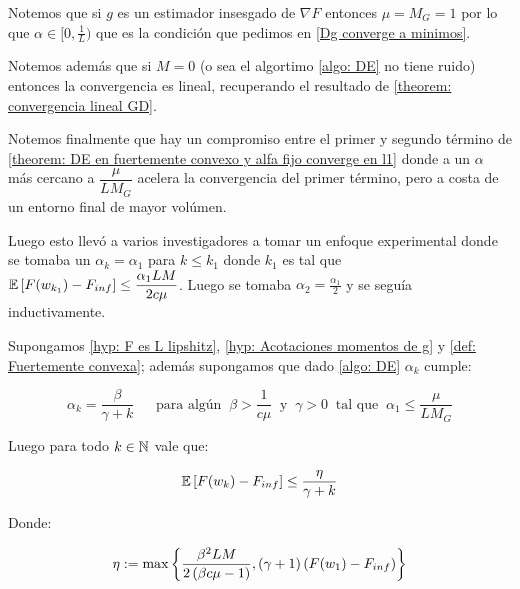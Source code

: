 \begin{remark}
	Notemos que si $g$ es un estimador insesgado de $\nabla F$ entonces $\mu = M_G = 1$ por lo que $\alpha \in [0, \frac{1}{L})$ que es la condici\'on que pedimos en \ref{Dg converge a minimos}.
\end{remark}

\begin{remark}
	Notemos adem\'as que si $M=0$ (o sea el algortimo \ref{algo: DE} no tiene ruido) entonces la convergencia es lineal, recuperando el resultado de \ref{theorem: convergencia lineal GD}.
\end{remark}

\begin{remark}
	Notemos finalmente que hay un compromiso entre el primer y segundo t\'ermino de \ref{theorem: DE en fuertemente convexo y alfa fijo converge en l1} donde a un $\alpha$ m\'as cercano a $\dfrac{\mu}{LM_G}$ acelera la convergencia del primer t\'ermino, pero a costa de un entorno final de mayor vol\'umen. 
	
	Luego esto llev\'o a varios investigadores a tomar un enfoque experimental donde se tomaba un $\alpha_k = \alpha_1$ para $k \leq k_1$ donde $k_1$ es tal que $\mathbb{E} \left[F(w_{k_1}) - F_{inf}\right] \leq \dfrac{\alpha_1 LM}{2c \mu}$. Luego se tomaba $\alpha_2 = \frac{\alpha_1}{2}$ y se segu\'ia inductivamente.
\end{remark}

\begin{theorem}
	\label{theorem: DE en fuertemente convexo y alfa decreciente converge en l1}
	Supongamos \ref{hyp: F es L lipshitz}, \ref{hyp: Acotaciones momentos de g} y \ref{def: Fuertemente convexa}; adem\'as supongamos que dado \ref{algo: DE} $\alpha_k$ cumple:
	
	\begin{equation}
	\label{eq: Condicion alfa Conv L1 fuertemente convexo decreciente}
	\alpha_k =  \dfrac{\beta}{\gamma + k} \quad \ \text{ para alg\'un } \ \beta > \frac{1}{c \mu} \  \text{ y } \ \gamma > 0 \  \text{ tal que } \ \alpha_1 \leq \dfrac{\mu}{L M_G} 
	\end{equation}
	
	Luego para todo $k \in {\mathbb{N}}$ vale que:
	
	\begin{equation*}
		\mathbb{E} \left[F(w_k) - F_{inf}\right] \leq \dfrac{\eta}{\gamma + k}
	\end{equation*}
	
	Donde:
	
	\begin{equation*}
		\eta := \max \left\lbrace\dfrac{\beta ^2 LM}{2 \left(\beta c \mu -1 \right)}, (\gamma + 1)\left(F(w_1) - F_{inf}\right)\right\rbrace
	\end{equation*}
	
\end{theorem}

